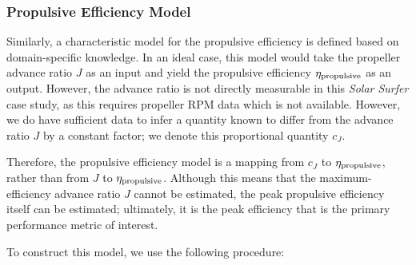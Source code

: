 \subsubsection{Propulsive Efficiency Model}
\label{subsubsec:propulsive_efficiency_model}

Similarly, a characteristic model for the propulsive efficiency is defined based on domain-specific knowledge. In an ideal case, this model would take the propeller advance ratio $J$ as an input and yield the propulsive efficiency $\eta_{\rm propulsive}$ as an output. However, the advance ratio is not directly measurable in this \emph{Solar Surfer} case study, as this requires propeller RPM data which is not available. However, we do have sufficient data to infer a quantity known to differ from the advance ratio $J$ by a constant factor; we denote this proportional quantity $c_J$.

Therefore, the propulsive efficiency model is a mapping from $c_J$ to $\eta_{\rm propulsive}$, rather than from $J$ to $\eta_{\rm propulsive}$. Although this means that the maximum-efficiency advance ratio $J$ cannot be estimated, the peak propulsive efficiency itself can be estimated; ultimately, it is the peak efficiency that is the primary performance metric of interest.

To construct this model, we use the following procedure:

